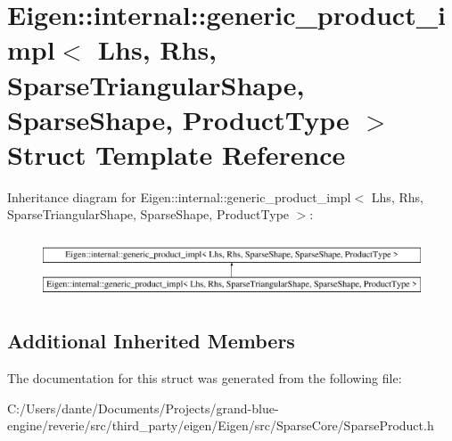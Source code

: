 \hypertarget{struct_eigen_1_1internal_1_1generic__product__impl_3_01_lhs_00_01_rhs_00_01_sparse_triangular_sh3486abfb0e2b8914c411a6ff792a44dd}{}\section{Eigen\+::internal\+::generic\+\_\+product\+\_\+impl$<$ Lhs, Rhs, Sparse\+Triangular\+Shape, Sparse\+Shape, Product\+Type $>$ Struct Template Reference}
\label{struct_eigen_1_1internal_1_1generic__product__impl_3_01_lhs_00_01_rhs_00_01_sparse_triangular_sh3486abfb0e2b8914c411a6ff792a44dd}
Inheritance diagram for Eigen\+::internal\+::generic\+\_\+product\+\_\+impl$<$ Lhs, Rhs, Sparse\+Triangular\+Shape, Sparse\+Shape, Product\+Type $>$\+:\begin{figure}[H]
\begin{center}
\leavevmode
\includegraphics[height=1.833061cm]{struct_eigen_1_1internal_1_1generic__product__impl_3_01_lhs_00_01_rhs_00_01_sparse_triangular_sh3486abfb0e2b8914c411a6ff792a44dd}
\end{center}
\end{figure}
\subsection*{Additional Inherited Members}


The documentation for this struct was generated from the following file\+:\begin{DoxyCompactItemize}
\item 
C\+:/\+Users/dante/\+Documents/\+Projects/grand-\/blue-\/engine/reverie/src/third\+\_\+party/eigen/\+Eigen/src/\+Sparse\+Core/Sparse\+Product.\+h\end{DoxyCompactItemize}
